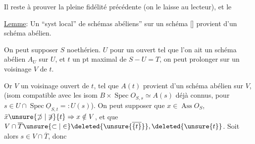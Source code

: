 Il reste à prouver la pleine fidélité précédente (on le laisse au lecteur), et le

\uline{Lemme}: Un ``syst local'' de schémas abéliens'' sur un schéma []  provient d'un schéma abélien.

On peut supposer $S$ noethérien.   $U$  pour un ouvert tel que l'on ait un schéma abélien $A_U$ sur $U$, et $t$ un pt maximal de $S-U=T$, on peut prolonger sur un voisinage $V$ de $t$.

Or  $V$ un voisinage ouvert de $t$, tel que $A(t)$ provient d'un schéma abélien sur $V$, 
(isom compatible avec les isom $B\times\operatorname{Spec}O_{S,s}\simeq A(s)$ déjà connus, pour $s\in U\cap\operatorname{Spec}\underline O_{S,t}=:U(s)$).  On peut supposer que $x\in\operatorname{Ass}O_S$, $\bar x\unsure{\not\supset|\not\ni}\{t\}\Rightarrow x\notin V$, et que $V\cap\overline T\unsure{\subset|\in}\deleted{\unsure{\overline{\{t\}}}},\deleted{\unsure{t}}$. Soit alors $s\in V\cap\overline T$, donc 

